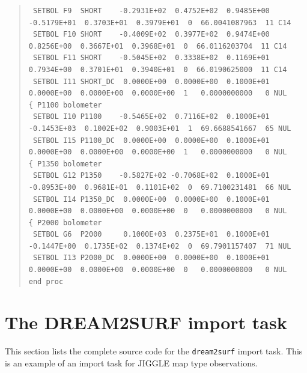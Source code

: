 \documentclass[twoside,11pt]{article}
\newenvironment{myquote}{\begin{quote}\begin{small}}{\end{small}\end{quote}}
\renewcommand{\_}{\texttt{\symbol{95}}}
\begin{document}
\begin{landscape}
\begin{myquote}
\begin{verbatim}
 SETBOL F9  SHORT    -0.2931E+02  0.4752E+02  0.9485E+00 -0.5179E+01  0.3703E+01  0.3979E+01  0  66.0041087963  11 C14
 SETBOL F10 SHORT    -0.4009E+02  0.3977E+02  0.9474E+00  0.8256E+00  0.3667E+01  0.3968E+01  0  66.0116203704  11 C14
 SETBOL F11 SHORT    -0.5045E+02  0.3338E+02  0.1169E+01  0.7934E+00  0.3701E+01  0.3940E+01  0  66.0190625000  11 C14
 SETBOL I11 SHORT_DC  0.0000E+00  0.0000E+00  0.1000E+01  0.0000E+00  0.0000E+00  0.0000E+00  1   0.0000000000   0 NUL
{ P1100 bolometer
 SETBOL I10 P1100    -0.5465E+02  0.7116E+02  0.1000E+01 -0.1453E+03  0.1002E+02  0.9003E+01  1  69.6688541667  65 NUL
 SETBOL I15 P1100_DC  0.0000E+00  0.0000E+00  0.1000E+01  0.0000E+00  0.0000E+00  0.0000E+00  1   0.0000000000   0 NUL
{ P1350 bolometer
 SETBOL G12 P1350    -0.5827E+02 -0.7068E+02  0.1000E+01 -0.8953E+00  0.9681E+01  0.1101E+02  0  69.7100231481  66 NUL
 SETBOL I14 P1350_DC  0.0000E+00  0.0000E+00  0.1000E+01  0.0000E+00  0.0000E+00  0.0000E+00  0   0.0000000000   0 NUL
{ P2000 bolometer
 SETBOL G6  P2000     0.1000E+03  0.2375E+01  0.1000E+01 -0.1447E+00  0.1735E+02  0.1374E+02  0  69.7901157407  71 NUL
 SETBOL I13 P2000_DC  0.0000E+00  0.0000E+00  0.1000E+01  0.0000E+00  0.0000E+00  0.0000E+00  0   0.0000000000   0 NUL
end proc
\end{verbatim}
\end{myquote}
\end{landscape}

\section{The DREAM2SURF import task}

This section lists the complete source code for the \texttt{dream2surf} import
task. This is an example of an import task for JIGGLE map type observations.
\end{document}
